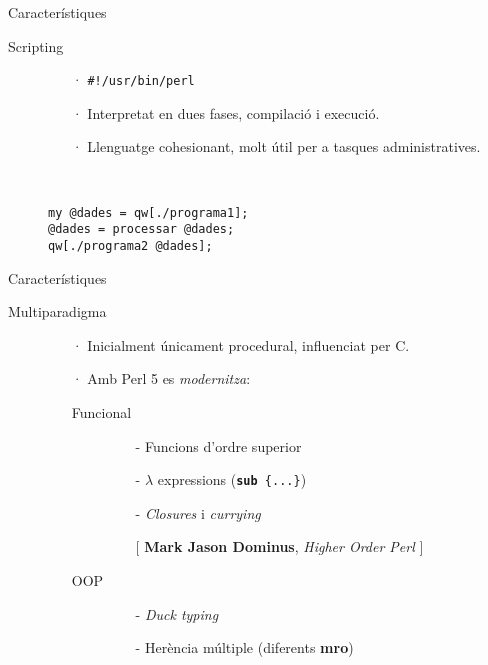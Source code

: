 \documentclass{beamer}
\newcommand{\cita}[1]{%
  \begin{flushright}%
    \tiny{[ #1 ]}%
  \end{flushright} %
}
\begin{document}
\begin{frame}[fragile]{Característiques}
  \begin{description}
  \item[Scripting] \hfill
    \begin{itemize}
    \item[·] \texttt{\#!/usr/bin/perl}
    \item[·] Interpretat en dues fases, compilació i execució.
    \item[·] Llenguatge cohesionant, molt útil per a tasques administratives.
    \end{itemize}
    \hfill \\[0.5cm]
    \begin{center}
      \begin{minipage}{0.6\textwidth}
    \begin{lstlisting}
my @dades = qw[./programa1];
@dades = processar @dades;
qw[./programa2 @dades];
    \end{lstlisting}
    \end{minipage}
      \end{center}
  \end{description}
\end{frame}
\begin{frame}{Característiques}
  \begin{description}
  \item[Multiparadigma] \hfill
    \begin{itemize}
    \item[·] Inicialment únicament procedural, influenciat per C.
    \item[·] Amb Perl 5 es \emph{modernitza}:
      \begin{description}
        \item[Funcional] \hfill
          \begin{itemize}
            \item[-] Funcions d'ordre superior
            \item[-] $\lambda$ expressions (\texttt{\textbf{sub} \{...\}})
            \item[-] \emph{Closures} i \emph{currying} \\
          \cita{\textbf{Mark Jason Dominus}, \emph{Higher Order Perl}}
          \end{itemize}
        \item [OOP] \hfill
          \begin{itemize}
            \item[-] \emph{Duck typing}
            \item[-] Herència múltiple (diferents \textbf{mro})
          \end{itemize}
      \end{description}
    \end{itemize}
  \end{description}
\end{frame}
\end{document}
